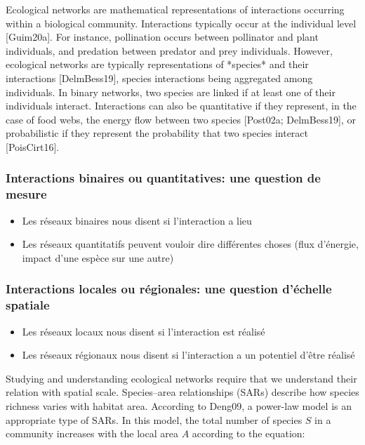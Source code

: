 Ecological networks are mathematical representations of interactions occurring
within a biological community. Interactions typically occur at the individual
level [Guim20a]. For instance, pollination occurs between pollinator and plant
individuals, and predation between predator and prey individuals. However,
ecological networks are typically representations of *species* and their
interactions [DelmBess19], species interactions being aggregated among
individuals. In binary networks, two species are linked if at least one of their
individuals interact. Interactions can also be quantitative if they represent,
in the case of food webs, the energy flow between two species [Post02a;
DelmBess19], or probabilistic if they represent the probability that two
species interact [PoisCirt16].

\subsubsection{Interactions binaires ou quantitatives: une question de mesure} 

\begin{itemize}
    \item Les réseaux binaires nous disent si l'interaction a lieu
    \item Les réseaux quantitatifs peuvent vouloir dire différentes choses (flux d'énergie, impact d'une espèce sur une autre)
\end{itemize}

\subsubsection{Interactions locales ou régionales: une question d'échelle spatiale} 

\begin{itemize}
    \item Les réseaux locaux nous disent si l'interaction est réalisé 
    \item Les réseaux régionaux nous disent si l'interaction a un potentiel d'être réalisé
\end{itemize}

Studying and understanding
ecological networks require that we understand their relation with spatial
scale.  Species–area relationships (SARs) describe how species richness varies
with habitat area. According to Deng09, a power-law model is an appropriate
type of SARs. In this model, the total number of species $S$ in a community
increases with the local area $A$ according to the equation:

